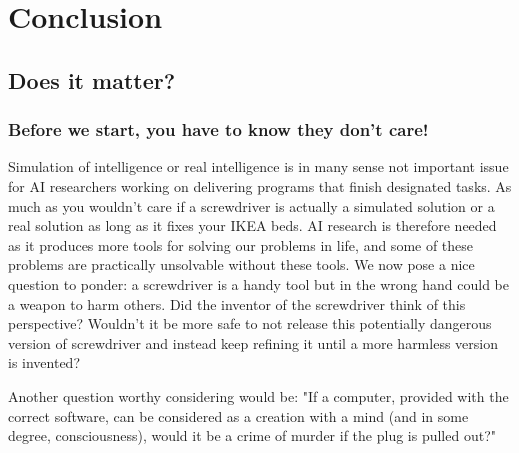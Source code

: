\documentclass[11pt]{article}
\newenvironment{sketch}{\color{dark-green-2}}{\ignorespacesafterend}
\begin{document}
\section{Conclusion}
\label{sec:conclusion}

\subsection{Does it matter?}

\subsubsection*{Before we start, you have to know they don't care!}
Simulation of intelligence or real intelligence is in many sense not important issue for AI researchers working on delivering programs that finish designated tasks. As much as you wouldn't care if a screwdriver is actually a simulated solution or a real solution as long as it fixes your IKEA beds. AI research is therefore needed as it produces more tools for solving our problems in life, and some of these problems are practically unsolvable without these tools. We now pose a nice question to ponder: a screwdriver is a handy tool but in the wrong hand could be a weapon to harm others. Did the inventor of the screwdriver think of this perspective? Wouldn't it be more safe to not release this potentially dangerous version of screwdriver and instead keep refining it until a more harmless version is invented?
  
Another question worthy considering would be: "If a computer, provided with the correct software, can be considered as a creation with a mind (and in some degree, consciousness), would it be a crime of murder if the plug is pulled out?"

%
\end{document}
